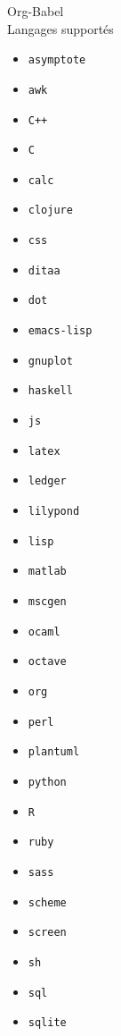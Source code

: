 \documentclass[presentation,t,hideothersubsections]{beamer}
\begin{document}
\begin{frame}[fragile,label=sec-5-7-2]{Org-Babel \\ Langages supportés}
 \begin{itemize}
\item \texttt{asymptote}
\item \texttt{awk}
\item \texttt{C++}
\item \texttt{C}
\item \texttt{calc}
\item \texttt{clojure}
\item \texttt{css}
\item \texttt{ditaa}
\item \texttt{dot}
\item \texttt{emacs-lisp}
\item \texttt{gnuplot}
\item \texttt{haskell}
\item \texttt{js}
\item \texttt{latex}
\item \texttt{ledger}
\item \texttt{lilypond}
\item \texttt{lisp}
\item \texttt{matlab}
\item \texttt{mscgen}
\item \texttt{ocaml}
\item \texttt{octave}
\item \texttt{org}
\item \texttt{perl}
\item \texttt{plantuml}
\item \texttt{python}
\item \texttt{R}
\item \texttt{ruby}
\item \texttt{sass}
\item \texttt{scheme}
\item \texttt{screen}
\item \texttt{sh}
\item \texttt{sql}
\item \texttt{sqlite}
\end{itemize}
\end{frame}
\end{document}
